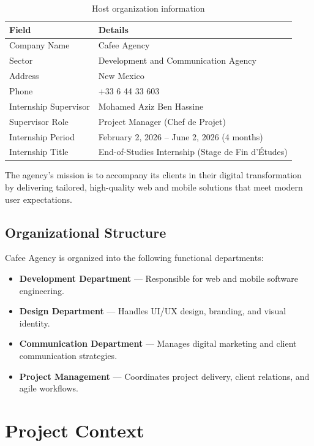 \documentclass[12pt,a4paper,oneside]{report}
\begin{document}
\begin{table}[H]
\centering
\caption{Host organization information}
\label{tab:host_org}
\begin{tabular}{|p{4.5cm}|p{8.5cm}|}
\hline
\textbf{Field} & \textbf{Details} \\
\hline
Company Name & Cafee Agency \\
\hline
Sector & Development and Communication Agency \\
\hline
Address & New Mexico \\
\hline
Phone & +33 6 44 33 603 \\
\hline
Internship Supervisor & Mohamed Aziz Ben Hassine \\
\hline
Supervisor Role & Project Manager (Chef de Projet) \\
\hline
Internship Period & February 2, 2026 -- June 2, 2026 (4 months) \\
\hline
Internship Title & End-of-Studies Internship (Stage de Fin d'Études) \\
\hline
\end{tabular}
\end{table}

The agency's mission is to accompany its clients in their digital transformation by delivering tailored, high-quality web and mobile solutions that meet modern user expectations.

\subsection{Organizational Structure}
Cafee Agency is organized into the following functional departments:
\begin{itemize}
    \item \textbf{Development Department} — Responsible for web and mobile software engineering.
    \item \textbf{Design Department} — Handles UI/UX design, branding, and visual identity.
    \item \textbf{Communication Department} — Manages digital marketing and client communication strategies.
    \item \textbf{Project Management} — Coordinates project delivery, client relations, and agile workflows.
\end{itemize}

\section{Project Context}
\end{document}
